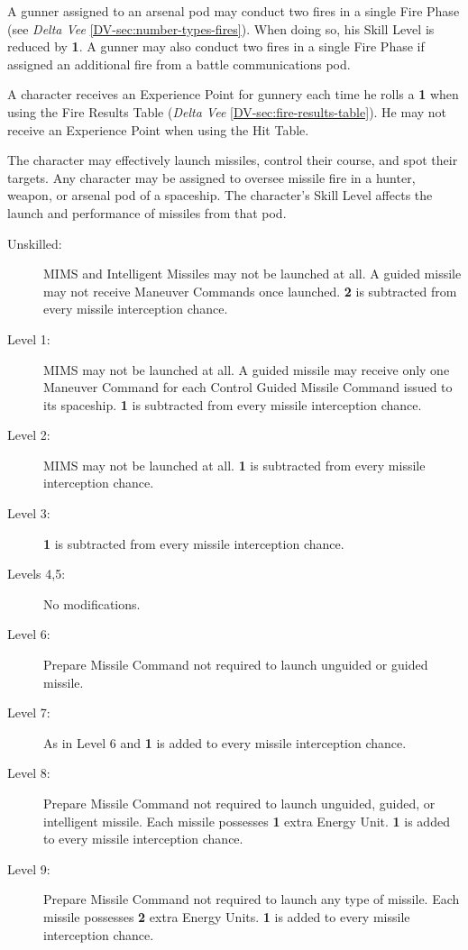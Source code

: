 A gunner assigned to an arsenal pod may conduct two fires in a single
Fire Phase (see \emph{Delta Vee} \ref{DV-sec:number-types-fires}).
When doing so, his Skill Level is reduced by \textbf{1}.  A gunner may
also conduct two fires in a single Fire Phase if assigned an
additional fire from a battle communications pod.

A character receives an Experience Point for gunnery each time he
rolls a \textbf{1} when using the Fire Results Table (\emph{Delta Vee}
\ref{DV-sec:fire-results-table}).  He may not receive an Experience
Point when using the Hit Table.

\label{sec:skill-missile-guidance}

The character may effectively launch missiles, control their course,
and spot their targets.  Any character may be assigned to oversee
missile fire in a hunter, weapon, or arsenal pod of a spaceship.  The
character's Skill Level affects the launch and performance of missiles
from that pod.

\begin{description}
\item[Unskilled:] MIMS and Intelligent Missiles may not be launched at
  all.  A guided missile may not receive Maneuver Commands once
  launched. \textbf{2} is subtracted from every missile interception
  chance.
\item[Level 1:] MIMS may not be launched at all.  A guided missile may
  receive only one Maneuver Command for each Control Guided Missile
  Command issued to its spaceship.  \textbf{1} is subtracted from
  every missile interception chance.
\item[Level 2:] MIMS may not be launched at all.  \textbf{1} is
  subtracted from every missile interception chance.
\item[Level 3:] \textbf{1} is subtracted from every missile
  interception chance.
\item[Levels 4,5:] No modifications.
\item[Level 6:] Prepare Missile Command not required to launch
  unguided or guided missile.
\item[Level 7:] As in Level 6 and \textbf{1} is added to every missile
  interception chance.
\item[Level 8:] Prepare Missile Command not required to launch
  unguided, guided, or intelligent missile.  Each missile possesses
  \textbf{1} extra Energy Unit.  \textbf{1} is added to every missile
  interception chance.
\item[Level 9:] Prepare Missile Command not required to launch any
  type of missile.  Each missile possesses \textbf{2} extra Energy
  Units. \textbf{1} is added to every missile interception chance.
\end{description}

